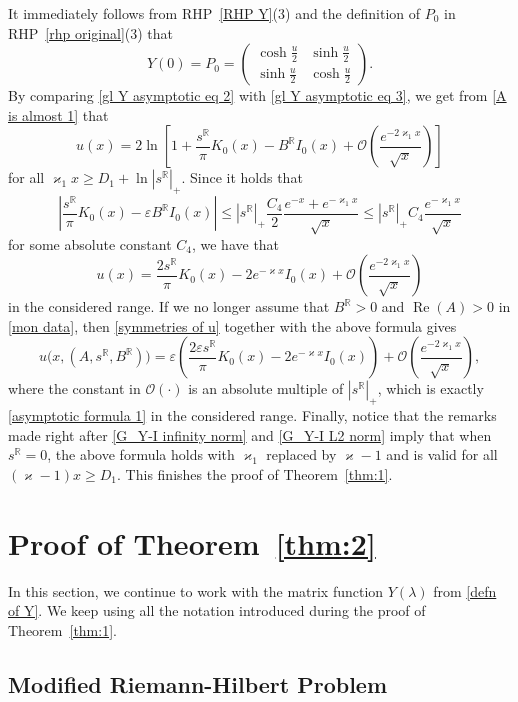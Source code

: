 \documentclass[a4paper,10pt,leqno]{amsart}
\numberwithin{equation}{subsection}
\theoremstyle{plain}
\theoremstyle{definition}
\theoremstyle{remark}
\theoremstyle{case}
\newcommand{\R}{\mathbb R}
\renewcommand{\O}{\mathcal{O}}
\renewcommand{\Re}{\operatorname{Re}}
\begin{document}
It immediately follows from RHP~\ref{RHP Y}(3) and the definition of \( P_0 \) in RHP~\ref{rhp original}(3) that
\begin{equation}
    Y(0) = P_0 = \begin{pmatrix}
        \cosh \frac{u}{2} & \sinh \frac{u}{2}\\
        \sinh \frac{u}{2} & \cosh \frac{u}{2}
    \end{pmatrix}. \label{gl Y asymptotic eq 3}
\end{equation}
By comparing \eqref{gl Y asymptotic eq 2} with \eqref{gl Y asymptotic eq 3}, we get from \eqref{A is almost 1} that
\[
u(x) = 2\ln \left[ 1 + \frac{s^\R}\pi K_0(x) - B^\R I_0(x) + \O\left( \frac{e^{-2\varkappa_1x}}{\sqrt x} \right) \right]
\]
for all \( \varkappa_1 x \geq D_1 + \ln|s^\R|_+ \). Since it holds that
\[
\left|\frac{s^\R}\pi K_0(x) - \varepsilon B^\R I_0(x)\right| \leq |s^\R|_+\frac{C_4}2 \frac{e^{-x}+e^{-\varkappa_1 x}}{\sqrt x} \leq |s^\R|_+C_4\frac{e^{-\varkappa_1 x}}{\sqrt x}
\]
for some absolute constant \( C_4 \), we have that
\[
u(x) = \frac{2 s^\R}\pi K_0(x) - 2 e^{-\varkappa x} I_0(x) + \O\left( \frac{e^{-2\varkappa_1x}}{\sqrt x} \right)
\]
in the considered range. If we no longer assume that \( B^\R>0 \) and \( \Re(A)>0 \) in \eqref{mon data}, then \eqref{symmetries of u} together with the above formula gives
\[
u\big(x, (A,s^\R,B^\R)\big) = \varepsilon \left( \frac{2 \varepsilon s^\R}\pi K_0(x) - 2 e^{-\varkappa x} I_0(x) \right) + \O\left( \frac{e^{-2\varkappa_1x}}{\sqrt x} \right),
\]
where the constant in \( \O(\cdot) \) is an absolute multiple of \( |s^\R|_+ \), which is exactly \eqref{asymptotic formula 1} in the considered range. Finally, notice that the remarks made right after \eqref{G_Y-I infinity norm} and \eqref{G_Y-I L2 norm} imply that when \( s^\R=0 \), the above formula holds with \( \varkappa_1 \) replaced by \( \varkappa-1\) and is valid for all \( (\varkappa-1)x\geq D_1\). This finishes the proof of Theorem~\ref{thm:1}.

\section{Proof of Theorem~\ref{thm:2}}

In this section, we continue to work with the matrix function \( Y(\lambda) \) from \eqref{defn of Y}. We keep using all the notation introduced during the proof of Theorem~\ref{thm:1}.


\subsection{Modified Riemann-Hilbert Problem}
\label{ss:3.1}
\end{document}
